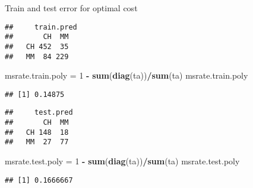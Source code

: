 \documentclass[]{article}
\newenvironment{Shaded}{\begin{snugshade}}{\end{snugshade}}
\newcommand{\DataTypeTok}[1]{\textcolor[rgb]{0.13,0.29,0.53}{#1}}
\newcommand{\DecValTok}[1]{\textcolor[rgb]{0.00,0.00,0.81}{#1}}
\newcommand{\KeywordTok}[1]{\textcolor[rgb]{0.13,0.29,0.53}{\textbf{#1}}}
\newcommand{\NormalTok}[1]{#1}
\newcommand{\OperatorTok}[1]{\textcolor[rgb]{0.81,0.36,0.00}{\textbf{#1}}}
\newcommand{\StringTok}[1]{\textcolor[rgb]{0.31,0.60,0.02}{#1}}
\begin{document}
Train and test error for optimal cost

\begin{Shaded}
\end{Shaded}

\begin{verbatim}
##     train.pred
##       CH  MM
##   CH 452  35
##   MM  84 229
\end{verbatim}

\begin{Shaded}
\begin{Highlighting}[]
\NormalTok{msrate.train.poly =}\StringTok{ }\DecValTok{1} \OperatorTok{-}\StringTok{ }\KeywordTok{sum}\NormalTok{(}\KeywordTok{diag}\NormalTok{(ta))}\OperatorTok{/}\KeywordTok{sum}\NormalTok{(ta)}
\NormalTok{msrate.train.poly}
\end{Highlighting}
\end{Shaded}

\begin{verbatim}
## [1] 0.14875
\end{verbatim}

\begin{Shaded}
\end{Shaded}

\begin{verbatim}
##     test.pred
##       CH  MM
##   CH 148  18
##   MM  27  77
\end{verbatim}

\begin{Shaded}
\begin{Highlighting}[]
\NormalTok{msrate.test.poly =}\StringTok{ }\DecValTok{1} \OperatorTok{-}\StringTok{ }\KeywordTok{sum}\NormalTok{(}\KeywordTok{diag}\NormalTok{(ta))}\OperatorTok{/}\KeywordTok{sum}\NormalTok{(ta)}
\NormalTok{msrate.test.poly}
\end{Highlighting}
\end{Shaded}

\begin{verbatim}
## [1] 0.1666667
\end{verbatim}
\end{document}
